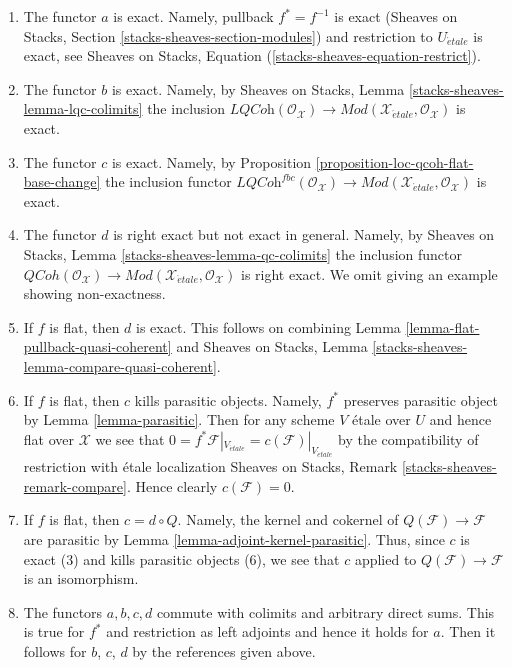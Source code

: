 \documentclass{stacks-project}
\theoremstyle{plain}
\theoremstyle{definition}
\theoremstyle{remark}
\numberwithin{equation}{subsection}
\def\etale{{\acute{e}tale}}
\def\QCoh{\mathit{QCoh}}
\begin{document}
\begin{enumerate}
\item The functor $a$ is exact. Namely, pullback $f^* = f^{-1}$ is exact 
(Sheaves on Stacks, Section \ref{stacks-sheaves-section-modules})
and restriction to $U_\etale$ is exact, see
Sheaves on Stacks, Equation (\ref{stacks-sheaves-equation-restrict}).
\item The functor $b$ is exact. Namely, by
Sheaves on Stacks, Lemma \ref{stacks-sheaves-lemma-lqc-colimits}
the inclusion $\textit{LQCoh}(\mathcal{O}_\mathcal{X}) \to
\textit{Mod}(\mathcal{X}_\etale, \mathcal{O}_\mathcal{X})$ is exact.
\item The functor $c$ is exact. Namely, by
Proposition \ref{proposition-loc-qcoh-flat-base-change}
the inclusion functor $\textit{LQCoh}^{fbc}(\mathcal{O}_\mathcal{X}) \to
\textit{Mod}(\mathcal{X}_\etale, \mathcal{O}_\mathcal{X})$ is exact.
\item The functor $d$ is right exact but not exact in general.
Namely, by Sheaves on Stacks, Lemma
\ref{stacks-sheaves-lemma-qc-colimits}
the inclusion functor $\QCoh(\mathcal{O}_\mathcal{X}) \to
\textit{Mod}(\mathcal{X}_\etale, \mathcal{O}_\mathcal{X})$ is right
exact. We omit giving an example showing non-exactness.
\item If $f$ is flat, then $d$ is exact. This follows on combining
Lemma \ref{lemma-flat-pullback-quasi-coherent} and
Sheaves on Stacks, Lemma \ref{stacks-sheaves-lemma-compare-quasi-coherent}.
\item If $f$ is flat, then $c$ kills parasitic objects.
Namely, $f^*$ preserves parasitic object by Lemma \ref{lemma-parasitic}.
Then for any scheme $V$ \'etale over $U$ and hence flat over $\mathcal{X}$
we see that
$0 = f^*\mathcal{F}|_{V_\etale} = c(\mathcal{F})|_{V_\etale}$
by the compatibility of restriction with \'etale localization
Sheaves on Stacks, Remark \ref{stacks-sheaves-remark-compare}.
Hence clearly $c(\mathcal{F}) = 0$.
\item If $f$ is flat, then $c = d \circ Q$. Namely, the kernel and
cokernel of $Q(\mathcal{F}) \to \mathcal{F}$ are parasitic by
Lemma \ref{lemma-adjoint-kernel-parasitic}. Thus, since
$c$ is exact (3) and kills parasitic objects (6),
we see that $c$ applied to $Q(\mathcal{F}) \to \mathcal{F}$
is an isomorphism.
\item The functors $a, b, c, d$ commute with colimits
and arbitrary direct sums. This is true for $f^*$ and restriction
as left adjoints and hence it holds for $a$. Then it follows for
$b$, $c$, $d$ by the references given above.

\end{enumerate}
\end{document}
